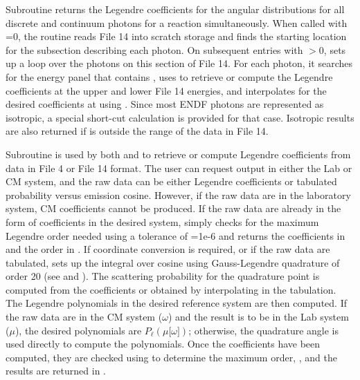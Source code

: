 Subroutine 
returns the Legendre coefficients for the angular
distributions for all discrete and continuum photons for a reaction
simultaneously.  When called with =0, the routine reads File 14
into scratch storage and finds the starting location for the subsection
describing each photon.  On subsequent entries with $>$0,
 sets up a loop over the  photons on this section
of File 14.  For each photon, it searches for the energy panel that
contains , uses  to retrieve
or compute the Legendre coefficients at the upper and lower File 14
energies, and interpolates for the desired coefficients at 
using .  Since most ENDF photons are represented as
isotropic, a special short-cut calculation is provided for that
case.  Isotropic results are also returned if  is outside
the range of the data in File 14.

Subroutine 
is used by both  and
 to retrieve or compute
Legendre coefficients from data in File 4 or File 14 format.
The user can request output in either the Lab or CM system, and
the raw data can be either Legendre coefficients
or tabulated probability versus emission cosine.  However, if the raw data
are in the laboratory system, CM coefficients cannot be produced.  If
the raw data are already in the form of coefficients in the desired system,
 simply checks for the maximum Legendre order needed using
a tolerance of =1e-6 and returns the coefficients in
 and the order in .  If coordinate conversion is
required, or if the raw data are tabulated,  sets up the
integral over cosine using Gauss-Legendre quadrature of order 20 (see
 and ).  The scattering probability for the quadrature
point is computed from the coefficients or obtained by interpolating in
the tabulation.  The Legendre polynomials in the desired reference system
are then computed.  If the raw data are in the CM system ($\omega$) and the
result is to be in the Lab system ($\mu$), the desired polynomials
are $P_{\ell}(\mu\bigl[\omega\bigr])$;  otherwise, the quadrature angle
is used directly to compute the polynomials.  Once the coefficients have
been computed, they are checked using  to determine the
maximum order, , and the results are returned
in .

